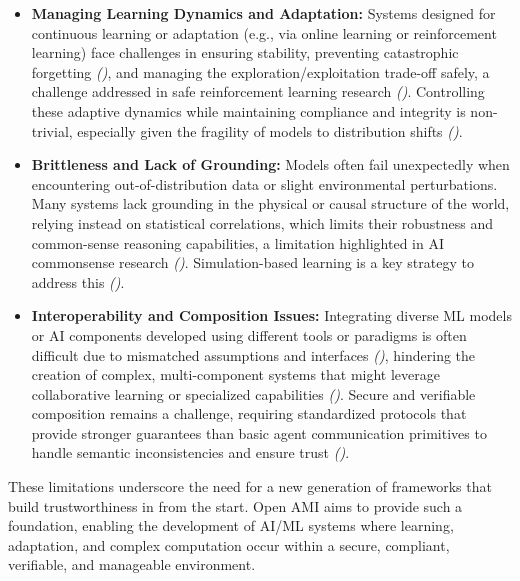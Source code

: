 \documentclass[12pt,a4paper]{report}
\renewcommand{\citep}[1]{\textit{\scriptsize{(\cite{#1})}}}
\begin{document}
\begin{itemize}[leftmargin=*]
		\item \textbf{Managing Learning Dynamics and Adaptation:} Systems designed for continuous learning or adaptation (e.g., via online learning or reinforcement learning) face challenges in ensuring stability, preventing catastrophic forgetting \citep{Wang2024ContinualLearningSurvey, AdditionalCitationRef24}, and managing the exploration/exploitation trade-off safely, a challenge addressed in safe reinforcement learning research \citep{AdditionalCitationRef16}. Controlling these adaptive dynamics while maintaining compliance and integrity is non-trivial, especially given the fragility of models to distribution shifts \citep{AdditionalCitationRef17, AdditionalCitationRef18}.
		\item \textbf{Brittleness and Lack of Grounding:} Models often fail unexpectedly when encountering out-of-distribution data or slight environmental perturbations. Many systems lack grounding in the physical or causal structure of the world, relying instead on statistical correlations, which limits their robustness and common-sense reasoning capabilities, a limitation highlighted in AI commonsense research \citep{AdditionalCitationRef19, Physics-InspiredReasoning_Ref34}. Simulation-based learning is a key strategy to address this \citep{Li2025DigitalTwins}.
		\item \textbf{Interoperability and Composition Issues:} Integrating diverse ML models or AI components developed using different tools or paradigms is often difficult due to mismatched assumptions and interfaces \citep{AdditionalCitationRef20}, hindering the creation of complex, multi-component systems that might leverage collaborative learning or specialized capabilities \citep{AgenticLandscape_Ref43}. Secure and verifiable composition remains a challenge, requiring standardized protocols that provide stronger guarantees than basic agent communication primitives to handle semantic inconsistencies and ensure trust \citep{AdditionalCitationRef21}.
	\end{itemize}
	
	These limitations underscore the need for a new generation of frameworks that build trustworthiness in from the start. Open AMI aims to provide such a foundation, enabling the development of AI/ML systems where learning, adaptation, and complex computation occur within a secure, compliant, verifiable, and manageable environment.
	
\end{document}
